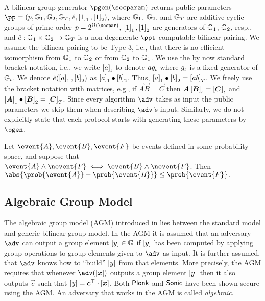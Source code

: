 A bilinear group generator $\pgen (\secparam)$ returns public parameters $ \pp =
(p, \GRP_1, \GRP_2, \GRP_T, \pair, \gone{1}, \gtwo{1})$, where $\mathbb{G}_1$,
$\mathbb{G}_2$, and $\mathbb{G}_T$ are additive cyclic groups of prime order $p = 2^{\Omega
  (\secpar)}$, $\left[1\right]_{1}, \left[1\right]_{2}$ are generators of $\mathbb{G}_1$, $\mathbb{G}_2$, resp.,
and $\hat{e}: \mathbb{G}_1 \times \mathbb{G}_2 \to \mathbb{G}_T$ is a non-degenerate
$\ppt$-computable bilinear pairing. We assume the bilinear pairing to be Type-3,
i.e., that there is no efficient isomorphism from $\mathbb{G}_1$ to $\mathbb{G}_2$ or from
$\mathbb{G}_2$ to $\mathbb{G}_1$. We use the by now standard bracket notation, i.e., we
write $\left[a\right]_{\iota}$ to denote $a g_{\iota}$ where $g_{\iota}$ is a fixed generator
of $\mathbb{G}_{\iota}$. We denote $\hat{e} (\left[a\right]_{1}, \left[b\right]_{2})$ as $\left[a\right]_{1} \bullet
\left[b\right]_{2}$. Thus, $\left[a\right]_{1} \bullet \left[b\right]_{2} = \left[a b\right]_{T}$. We freely use the
bracket notation with matrices, e.g., if $\vec{A} \vec{B} = \vec{C}$ then
$\vec{A} \grpgi{\vec{B}} = \grpgi{\vec{C}}$ and $\gone{\vec{A}}\bullet
\gtwo{\vec{B}} = \gtar{\vec{C}}$. Since every algorithm $\adv$ takes as input
the public parameters we skip them when describing $\adv$'s input. Similarly, we
do not explicitly state that each protocol starts with generating these
parameters by $\pgen$.

\begin{lemma}
	\label{lem:difference_lemma}
	Let $\event{A}, \event{B}, \event{F}$ be events defined in some probability
	space, and suppose that $\event{A} \land \nevent{F} \iff \event{B}
		\land \nevent{F}$.  Then 
	$
		\abs{\prob{\event{A}} - \prob{\event{B}}} \leq \prob{\event{F}}\,.
	$
\end{lemma}
\subsection{Algebraic Group Model}
The algebraic group model (AGM) introduced in \cite{C:FucKilLos18} lies between
the standard model and generic bilinear group model. In the AGM it is assumed
that an adversary $\adv$ can output a group element $\left[y\right] \in \mathbb{G}$ if
$\left[y\right]$ has been computed by applying group operations to group elements
given to $\adv$ as input. It is further assumed, that $\adv$ knows how to
``build'' $\left[y\right]$ from that elements. More precisely, the AGM requires that
whenever $\adv(\gnone{\vec{x}})$ outputs a group element $\left[y\right]$ then it
also outputs $\vec{c}$ such that $\gnone{y} = \vec{c}^\top \cdot
\gnone{\vec{x}}$. Both $\textnormal{\textsf{Plonk}}$ and ${\textnormal{\textsf{Sonic}}}$ have been shown secure using the
AGM. An adversary that works in the AGM is called \emph{algebraic}.
 
